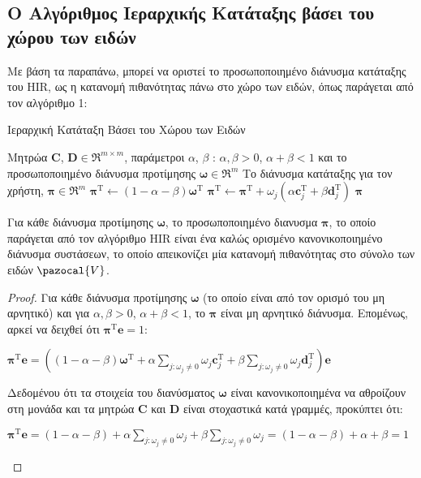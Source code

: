 \subsection{Ο Αλγόριθμος Ιεραρχικής Κατάταξης βάσει του χώρου των ειδών}
Με βάση τα παραπάνω, μπορεί να οριστεί το προσωποποιημένο διάνυσμα κατάταξης του {\en HIR}, ως η κατανομή πιθανότητας πάνω στο χώρο των ειδών, όπως παράγεται από τον αλγόριθμο 1:
\begin{algorithm}[ht]
  \caption{Ιεραρχική Κατάταξη Βάσει του Χώρου των Ειδών}\label{}
  \begin{algorithmic}[1]
    \Require Μητρώα $\mathbf{C}$, $\mathbf{D} \in \Re^{m\times m}$, παράμετροι $\alpha$, $\beta$ : $\alpha, \beta > 0$, $\alpha + \beta < 1$ και το προσωποποιημένο διάνυσμα προτίμησης $\boldsymbol{\omega}\in \Re^m$
    \Ensure Το διάνυσμα κατάταξης για τον χρήστη, $\boldsymbol{\pi}\in \Re^m$
    \medskip
    \State $\boldsymbol{\pi}^\text{T} \gets (1-\alpha - \beta)\boldsymbol{\omega}^\text{T}$
      \State $\boldsymbol{\pi}^\text{T} \gets \boldsymbol{\pi}^\text{T} + \omega_j(\alpha\mathbf{c}_{j}^\text{T} + \beta\mathbf{d}_{j}^\text{T})$
    \EndFor
    \State \Return $ \boldsymbol{\pi} $
  \end{algorithmic}
\end{algorithm}
\begin{theorem}
Για κάθε διάνυσμα προτίμησης $\boldsymbol{\omega}$, το προσωποποιημένο διανυσμα $\boldsymbol{\pi}$, το οποίο παράγεται από τον αλγόριθμο \en HIR \el είναι ένα καλώς ορισμένο κανονικοποιημένο διάνυσμα συστάσεων, το οποίο απεικονίζει μία κατανομή πιθανότητας στο σύνολο των ειδών $\pazocal{V}$.
\end{theorem}
\begin{proof}
Για κάθε διάνυσμα προτίμησης $\boldsymbol{\omega}$ (το οποίο είναι από τον ορισμό του μη αρνητικό) και για $\alpha, \beta > 0$, $\alpha+\beta<1$, το $\boldsymbol{\pi}$ είναι μη αρνητικό διάνυσμα. Επομένως, αρκεί να δειχθεί ότι $\boldsymbol{\pi}^{\text{T}}\mathbf{e} = 1$:
\begin{center}
$\boldsymbol{\pi}^{\text{T}}\mathbf{e} = ( (1 - \alpha - \beta) \boldsymbol{\omega}^{\text{T}} + \alpha \sum\limits_{j:{\omega}_j\neq 0} {\omega}_j\mathbf{c}_j^{\text{T}} + \beta \sum\limits_{j:{\omega}_j\neq 0} {\omega}_j\mathbf{d}_j^{\text{T}})\mathbf{e}$
\end{center}
Δεδομένου ότι τα στοιχεία του διανύσματος $\boldsymbol{\omega}$ είναι κανονικοποιημένα να αθροί\-ζουν στη μονάδα και τα μητρώα $\mathbf{C}$ και $\mathbf{D}$ είναι στοχαστικά κατά γραμμές, προκύπτει ότι: 
\begin{center}
$\boldsymbol{\pi}^{\text{T}}\mathbf{e} = (1 - \alpha -\beta) + 
\alpha \sum\limits_{j:{\omega}_j\neq 0}{\omega}_j + \beta \sum\limits_{j:{\omega}_j\neq 0} {\omega}_j = (1 - \alpha -\beta) + \alpha + \beta = 1 $
\end{center}
\end{proof}
